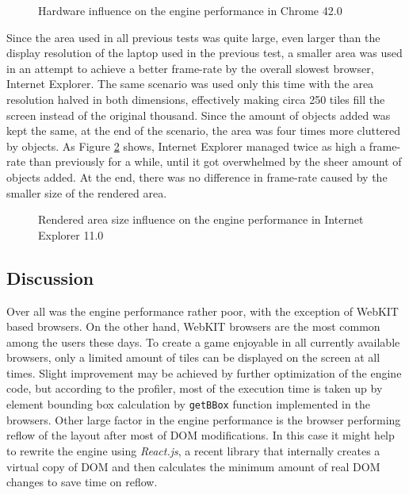\documentclass[11pt,oneside, final]{fithesis2}
\begin{document}
\begin{figure}[h]
	\centering
	
	\caption{Hardware influence on the engine performance in Chrome 42.0}
	\label{performance-hw}
\end{figure}

Since the area used in all previous tests was quite large, even larger than the display resolution of the laptop used in the previous test, a smaller area was used in an attempt to achieve a better frame-rate by the overall slowest browser, Internet Explorer. The same scenario was used only this time with the area resolution halved in both dimensions, effectively making circa 250 tiles fill the screen instead of the original thousand. Since the amount of objects added was kept the same, at the end of the scenario, the area was four times more cluttered by objects. As Figure \ref{performance-size} shows, Internet Explorer managed twice as high a frame-rate than previously for a while, until it got overwhelmed by the sheer amount of objects added. At the end, there was no difference in frame-rate caused by the smaller size of the rendered area.

\begin{figure}[h]
	\centering
	
	\caption{Rendered area size influence on the engine performance in Internet Explorer 11.0}
	\label{performance-size}
\end{figure}

\subsection{Discussion}
Over all was the engine performance rather poor, with the exception of WebKIT based browsers. On the other hand, WebKIT browsers are the most common among the users these days\cite{browserstats}. To create a game enjoyable in all currently available browsers, only a limited amount of tiles can be displayed on the screen at all times. Slight improvement may be achieved by further optimization of the engine code, but according to the profiler, most of the execution time is taken up by element bounding box calculation by \texttt{getBBox} function implemented in the browsers\cite{svgtypes}. Other large factor in the engine performance is the browser performing reflow of the layout after most of DOM modifications. In this case it might help to rewrite the engine using \emph{React.js}, a recent library that internally creates a virtual copy of DOM and then calculates the minimum amount of real DOM changes to save time on reflow\cite{sobo}.
\end{document}
